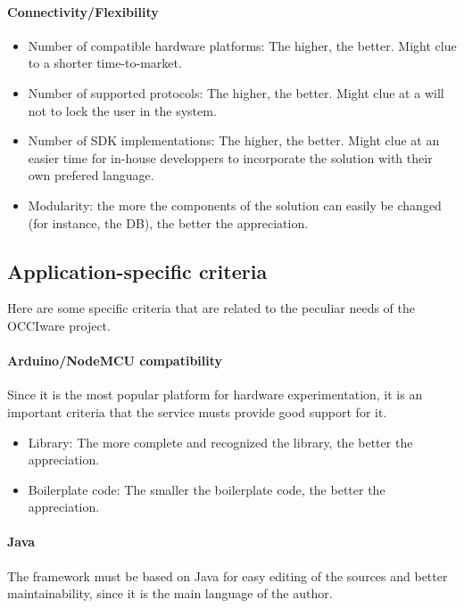 \documentclass{article}
\begin{document}
\paragraph{Connectivity/Flexibility}


\begin{itemize}
\item Number of compatible hardware platforms: The higher, the better. Might clue to a shorter time-to-market.
\item Number of supported protocols: The higher, the better. Might clue at a will not to lock the user in the system.
\item Number of SDK implementations: The higher, the better. Might clue at an easier time for in-house developpers to incorporate the solution with their own prefered language.
\item Modularity: the more the components of the solution can easily be changed (for instance, the DB), the better the appreciation.
\end{itemize}

\subsection{Application-specific criteria}

Here are some specific criteria that are related to the peculiar needs of the OCCIware project.

\paragraph{Arduino/NodeMCU compatibility} Since it is the most popular platform for hardware experimentation, it is an important criteria that the service musts provide good support for it.

\begin{itemize}
\item Library: The more complete and recognized the library, the better the appreciation.
\item Boilerplate code: The smaller the boilerplate code, the better the appreciation.
\end{itemize}

\paragraph{Java} The framework must be based on Java for easy editing of the sources and better maintainability, since it is the main language of the author.
\end{document}
